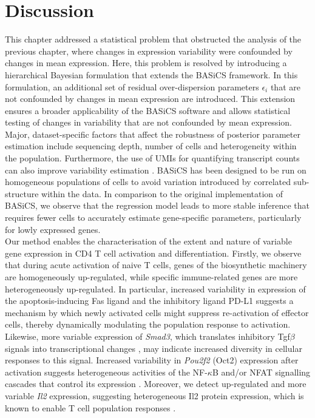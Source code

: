 
\section{Discussion}

This chapter addressed a statistical problem that obstructed the analysis of the previous chapter, where changes in expression variability were confounded by changes in mean expression. 
Here, this problem is resolved by introducing a hierarchical Bayesian formulation that extends the BASiCS framework. 
In this formulation, an additional set of residual over-dispersion parameters $\epsilon_i$ that are not confounded by changes in mean expression are introduced. 
This extension ensures a broader applicability of the BASiCS software and allows statistical testing of changes in variability that are not confounded by mean expression.  \\ 

Major, dataset-specific factors that affect the robustness of posterior parameter estimation include sequencing depth, number of cells and heterogeneity within the population. 
Furthermore, the use of UMIs for quantifying transcript counts can also improve variability estimation \citep{Grun2014}. 
BASiCS has been designed to be run on homogeneous populations of cells to avoid variation introduced by correlated sub-structure within the data. 
In comparison to the original implementation of BASiCS, we observe that the regression model leads to more stable inference that requires fewer cells to accurately estimate gene-specific parameters, particularly for lowly expressed genes. \\

Our method enables the characterisation of the extent and nature of variable gene expression in CD4\plus{} T cell activation and differentiation. 
Firstly, we observe that during acute activation of naive T cells, genes of the biosynthetic machinery are homogeneously up-regulated, while specific immune-related genes are more heterogeneously up-regulated. In particular, increased variability in expression of the apoptosis-inducing Fas ligand \citep{Strasser2009} and the inhibitory ligand PD-L1 \citep{Chikuma2016} suggests a mechanism by which newly activated cells might suppress re-activation of effector cells, thereby dynamically modulating the population response to activation. 
Likewise, more variable expression of \emph{Smad3}, which translates inhibitory \gls{Tgf}$\beta$ signals into transcriptional changes \citep{Delisle2013}, may indicate increased diversity in cellular responses to this signal. 
Increased variability in \textit{Pou2f2} (Oct2) expression after activation suggests heterogeneous activities of the NF-$\kappa$B and/or \gls{NFAT} signalling cascades that control its expression \citep{Mueller2013}.
Moreover, we detect up-regulated and more variable \textit{Il2} expression, suggesting heterogeneous Il2 protein expression, which is known to enable T cell population responses \citep{Fuhrmann2016}. 

